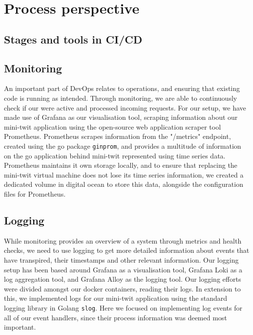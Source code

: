 \section{Process perspective} \label{pp}
\subsection{Stages and tools in CI/CD} %


\subsection{Monitoring} %
An important part of DevOps relates to operations, and ensuring that existing code is running as intended. Through monitoring, we are able to continuously check if our were active and processed incoming requests. For our setup, we have made use of Grafana as our visualisation tool, scraping information about our mini-twit application using the open-source web application scraper tool Prometheus. Prometheus scrapes information from the "/metrics" endpoint, created using the go package \texttt{ginprom}, and provides a multitude of information on the go application behind mini-twit represented using time series data. Prometheus maintains it own storage locally, and to ensure that replacing the mini-twit virtual machine does not lose its time series information, we created a dedicated volume in digital ocean to store this data, alongside the configuration files for Prometheus. 

\subsection{Logging} %
While monitoring provides an overview of a system through metrics and health checks, we need to use logging to get more detailed information about events that have transpired, their timestamps and other relevant information. Our logging setup has been based around Grafana as a visualisation tool, Grafana Loki as a log aggregation tool, and Grafana Alloy as the logging tool. Our logging efforts were divided amongst our docker containers, reading their logs. In extension to this, we implemented logs for our mini-twit application using the standard logging library in Golang \texttt{slog}. Here we focused on implementing log events for all of our event handlers, since their process information was deemed most important. 


